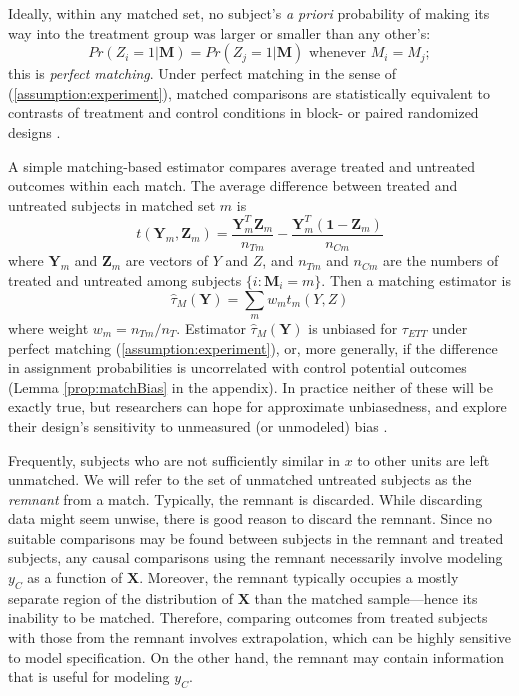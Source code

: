 \documentclass[12pt]{article}\usepackage[]{graphicx}\usepackage[]{color}
\newcommand{\ncm}{n_{Cm}}
\newcommand{\ntm}{n_{Tm}}
\newcommand{\Match}{M}
\newcommand{\match}{m}
\newcommand{\covMat}{\bm{X}}
\newcommand{\covVec}{x}
\begin{document}
Ideally, within any matched set, no subject's \textit{a priori} probability of making its way into the treatment
group was larger or smaller than any other's:
\begin{equation}\label{assumption:experiment}
Pr(Z_i=1| \bm{\Match})=Pr(Z_{j}=1|\bm{\Match})  \text{ whenever } \Match_i=\Match_{j} ;
\end{equation}
this is \textit{perfect matching}.  Under perfect matching in the sense of (\ref{assumption:experiment}), matched comparisons are statistically equivalent to contrasts of treatment and control conditions in block- or paired randomized designs \citep[e.g.,][]{braitman2002roc,rubin2008objective,hansen2011propensity}.

A simple matching-based estimator compares average treated and
untreated outcomes within each match.
The average difference between treated and untreated subjects in matched set
$m$ is
\begin{equation*}
t(\bm{Y}_m,\bm{Z}_m)=\frac{\bm{Y}_m^T\bm{Z}_m}{\ntm}-\frac{\bm{Y}_m^T(\bm{1}-\bm{Z}_m)}{\ncm}
\end{equation*}
where $\bm{Y}_m$ and $\bm{Z}_m$ are vectors of $Y$ and $Z$, and $\ntm$ and $\ncm$ are the numbers of treated and untreated among subjects $\{ i : \bm{\Match}_i=m\}$.
Then a matching estimator is
\begin{equation}\label{MatchingEstimator}
\hat{\tau}_\Match (\bm{Y})=\sum_m w_m t_m(Y,Z)
\end{equation}
where weight $w_m=\ntm/n_T$.
Estimator $\hat{\tau}_\Match (\bm{Y})$ is unbiased for $\tau_{ETT}$ under perfect matching
(\ref{assumption:experiment}), or, more generally, if the difference in
assignment probabilities is uncorrelated with control potential
outcomes (Lemma \ref{prop:matchBias} in the appendix).
In practice neither of these will be exactly true, but researchers can hope for approximate unbiasedness, and explore their design's sensitivity to unmeasured (or unmodeled) bias \citep[e.g.][]{gastwirth1998das,hosmanetal2010}.

Frequently, subjects who are not sufficiently
similar in $\covVec$ to other units are left unmatched.
We will refer to the set of unmatched untreated subjects as the
\emph{remnant} %
from a match.
Typically, the remnant is discarded.
While discarding data might seem unwise, there is good reason to discard the remnant.
Since no suitable comparisons may be found between subjects in the remnant and treated subjects, any causal comparisons using the remnant necessarily involve modeling $y_C$ as a function of $\covMat$.
Moreover, the remnant typically occupies a mostly separate region of the distribution of $\covMat$ than the matched sample---hence its inability to be matched.
Therefore, comparing outcomes from treated subjects with those from
the remnant involves extrapolation, which can be highly sensitive to
model specification. On the other hand, the remnant may contain information that is useful for modeling $y_C$.
\end{document}
